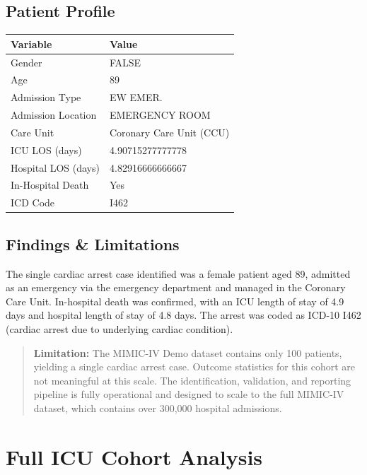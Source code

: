 \documentclass[
]{article}
\newcounter{none} %
\begin{document}
\subsection{Patient Profile}\label{patient-profile}

{\def\LTcaptype{none} %
\begin{longtable}[]{@{}ll@{}}
\toprule\noalign{}
Variable & Value \\
\midrule\noalign{}
\endhead
\bottomrule\noalign{}
\endlastfoot
Gender & FALSE \\
Age & 89 \\
Admission Type & EW EMER. \\
Admission Location & EMERGENCY ROOM \\
Care Unit & Coronary Care Unit (CCU) \\
ICU LOS (days) & 4.90715277777778 \\
Hospital LOS (days) & 4.82916666666667 \\
In-Hospital Death & Yes \\
ICD Code & I462 \\
\end{longtable}
}

\subsection{Findings \& Limitations}\label{findings-limitations}

The single cardiac arrest case identified was a female patient aged 89,
admitted as an emergency via the emergency department and managed in the
Coronary Care Unit. In-hospital death was confirmed, with an ICU length
of stay of 4.9 days and hospital length of stay of 4.8 days. The arrest
was coded as ICD-10 I462 (cardiac arrest due to underlying cardiac
condition).

\begin{quote}
\textbf{Limitation:} The MIMIC-IV Demo dataset contains only 100
patients, yielding a single cardiac arrest case. Outcome statistics for
this cohort are not meaningful at this scale. The identification,
validation, and reporting pipeline is fully operational and designed to
scale to the full MIMIC-IV dataset, which contains over 300,000 hospital
admissions.
\end{quote}

\section{Full ICU Cohort Analysis}\label{full-icu-cohort-analysis}
\end{document}
